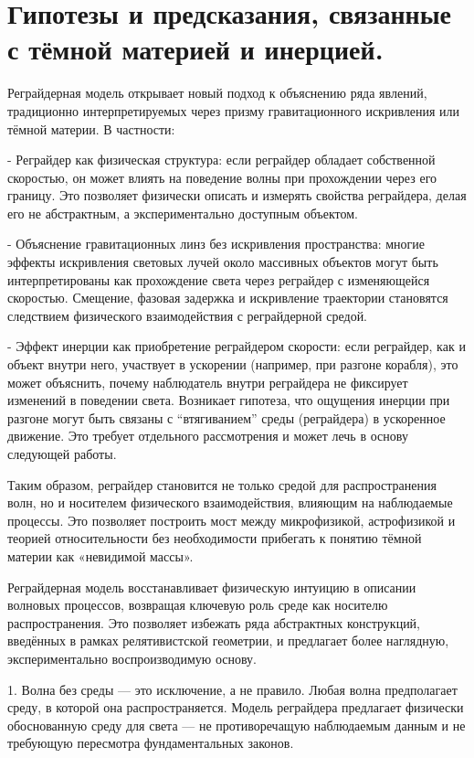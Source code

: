 \documentclass[12pt]{article}
\begin{document}
\section*{Гипотезы и предсказания, связанные с тёмной материей и инерцией.}


Реграйдерная модель открывает новый подход к объяснению ряда явлений, традиционно интерпретируемых через призму гравитационного искривления или тёмной материи. В частности:

- Реграйдер как физическая структура: если реграйдер обладает собственной скоростью, он может влиять на поведение волны при прохождении через его границу. Это позволяет физически описать и измерять свойства реграйдера, делая его не абстрактным, а экспериментально доступным объектом.

- Объяснение гравитационных линз без искривления пространства: многие эффекты искривления световых лучей около массивных объектов могут быть интерпретированы как прохождение света через реграйдер с изменяющейся скоростью. Смещение, фазовая задержка и искривление траектории становятся следствием физического взаимодействия с реграйдерной средой.

- Эффект инерции как приобретение реграйдером скорости: если реграйдер, как и объект внутри него, участвует в ускорении (например, при разгоне корабля), это может объяснить, почему наблюдатель внутри реграйдера не фиксирует изменений в поведении света. Возникает гипотеза, что ощущения инерции при разгоне могут быть связаны с “втягиванием” среды (реграйдера) в ускоренное движение. Это требует отдельного рассмотрения и может лечь в основу следующей работы.

Таким образом, реграйдер становится не только средой для распространения волн, но и носителем физического взаимодействия, влияющим на наблюдаемые процессы. Это позволяет построить мост между микрофизикой, астрофизикой и теорией относительности без необходимости прибегать к понятию тёмной материи как «невидимой массы».

Реграйдерная модель восстанавливает физическую интуицию в описании волновых процессов, возвращая ключевую роль среде как носителю распространения. Это позволяет избежать ряда абстрактных конструкций, введённых в рамках релятивистской геометрии, и предлагает более наглядную, экспериментально воспроизводимую основу.

1. Волна без среды — это исключение, а не правило.
Любая волна предполагает среду, в которой она распространяется. Модель реграйдера предлагает физически обоснованную среду для света — не противоречащую наблюдаемым данным и не требующую пересмотра фундаментальных законов.
\end{document}

